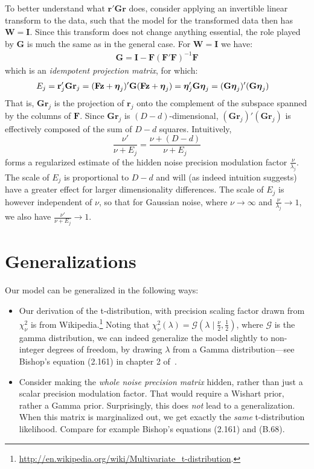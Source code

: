 \documentclass[a4paper,oneside,12pt,english]{report}
\def\zvec{\mathbf{z}}
\def\Wmat{\mathbf{W}}
\def\Fmat{\mathbf{F}}
\def\Gmat{\mathbf{G}}
\def\Imat{\mathbf{I}}
\def\Gmat{\mathbf{G}}
\def\rvec{\mathbf{r}}
\begin{document}
To better understand what $\rvec'\Gmat\rvec$ does, consider applying an invertible linear transform to the data, such that the model for the transformed data then has $\Wmat=\Imat$. Since this transform does not change anything essential, the role played by $\Gmat$ is much the same as in the general case. For $\Wmat=\Imat$ we have:
\begin{align*}
\Gmat=\Imat - \Fmat(\Fmat'\Fmat)^{-1}\Fmat
\end{align*}
which is an \emph{idempotent projection matrix}, for which:
\begin{align*}
E_j &= \rvec_j'\Gmat\rvec_j = (\Fmat\zvec+\etavec_j)'\Gmat(\Fmat\zvec+\etavec_j) = \etavec_j'\Gmat\etavec_j = (\Gmat\etavec_j)'(\Gmat\etavec_j)
\end{align*}
That is, $\Gmat\rvec_j$ is the projection of $\rvec_j$ onto the complement of the subspace spanned by the columns of $\Fmat$. Since $\Gmat\rvec_j$ is $(D-d)$-dimensional, $(\Gmat\rvec_j)'(\Gmat\rvec_j)$ is effectively composed of the sum of $D-d$ squares. Intuitively, 
$$\frac{\nu'}{\nu+E_j}=\frac{\nu+(D-d)}{\nu+E_j}$$ 
forms a regularized estimate of the hidden noise precision modulation factor $\frac{\nu}{\lambda_j}$. The scale of $E_j$ is proportional to $D-d$ and will (as indeed intuition suggests) have a greater effect for larger dimensionality differences. The scale of $E_j$ is however independent of $\nu$, so that for Gaussian noise, where $\nu\to\infty$ and $\frac{\nu}{\lambda_j}\to1$, we also have $\frac{\nu'}{\nu+E_j}\to1$. 


\section{Generalizations}
\def\GD{\mathcal{G}}
Our model can be generalized in the following ways:
\begin{itemize}
	\item Our derivation of the t-distribution, with precision scaling factor drawn from $\chi^2_\nu$ is from Wikipedia.\footnote{\url{http://en.wikipedia.org/wiki/Multivariate_t-distribution}.} Noting that $\chi^2_\nu(\lambda)=\GD(\lambda\mid\tfrac{\nu}{2},\tfrac12)$, where $\GD$ is the gamma distribution, we can indeed generalize the model slightly to non-integer degrees of freedom, by drawing $\lambda$ from a Gamma distribution---see Bishop's equation (2.161) in chapter 2 of~\cite{PRML}. 
%
	\item Consider making the \emph{whole noise precision matrix} hidden, rather than just a scalar precision modulation factor. That would require a Wishart prior, rather a Gamma prior. Surprisingly, this does \emph{not} lead to a generalization. When this matrix is marginalized out, we get exactly the \emph{same} t-distribution likelihood. Compare for example Bishop's equations (2.161) and (B.68).
\end{itemize}
\end{document}
